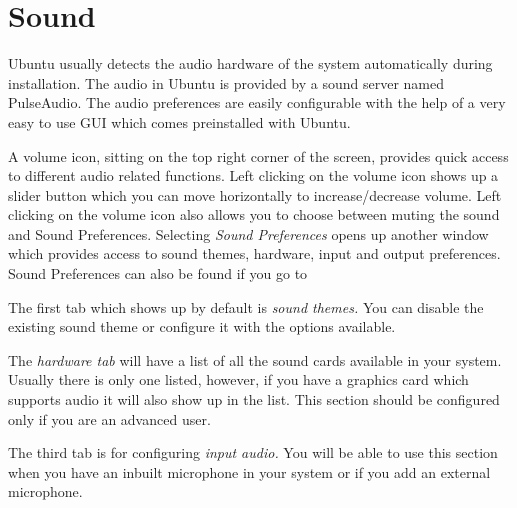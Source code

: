 


\label{sec:Preferecs and Hardware:Sound}

\section{Sound}

Ubuntu usually detects the audio hardware of the system automatically during
installation. The audio in Ubuntu is provided by a sound server named
PulseAudio. The audio preferences are easily configurable with the help of a
very easy to use \gls{GUI} which comes preinstalled with Ubuntu.

A volume icon, sitting on the top right corner of the screen, provides quick
access to different audio related functions. Left clicking on the volume icon
shows up a slider button which you can move horizontally to increase/decrease 
volume. Left clicking on the volume icon also allows you to choose between muting 
the sound and Sound Preferences. Selecting \emph{Sound Preferences} opens up another 
window which provides access to sound themes, hardware, input and output preferences. 
Sound Preferences can also be found if you go to 

The first tab which shows up by default is \emph{sound themes.} You can disable the 
existing sound theme or configure it with the options available. 

The \emph{hardware tab} will have a list of all the sound cards available in your system. 
Usually there is only one listed, however, if you have a graphics card which supports
 audio it will also show up in the list. This section should be configured only if you are an advanced user.

The third tab is for configuring \emph{input audio.} You will be able to use this section
when you have an inbuilt microphone in your system or if you add an external microphone.

